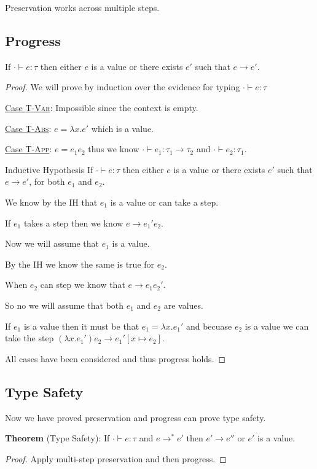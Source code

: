 \documentclass{lecturenotes}
\newenvironment{theorem}[2][Theorem]{\begin{trivlist}
\item[\hskip \labelsep {\bfseries #1}\hskip \labelsep {\bfseries #2.}]}{\end{trivlist}}
\newenvironment{corollary}[2][Corollary]{\begin{trivlist}
\item[\hskip \labelsep {\bfseries #1}\hskip \labelsep {\bfseries #2.}]}{\end{trivlist}}
\begin{document}
\begin{corollary}{Multi-step Preservation}
  Preservation works across multiple steps. 
\end{corollary}

\subsection{Progress}

\begin{theorem}{Progress}
  If $\cdot \vdash e : \tau$ then either $e$ is a value or there exists $e'$ such that $e \rightarrow e'$. 
\end{theorem}

\begin{proof}
  We will prove by induction over the evidence for typing $\cdot \vdash e : \tau$

  \underline{Case \textsc{T-Var}}: Impossible since the context is empty.

  \underline{Case \textsc{T-Abs}}: $e = \lambda x.e'$ which is a value. 

  \underline{Case \textsc{T-App}}: $e = e_1e_2$ thus we know $\cdot \vdash e_1 : \tau_1 \rightarrow \tau_2$ and $\cdot \vdash e_2 : \tau_1$.

    Inductive Hypothesis If $\cdot \vdash e : \tau$ then either $e$ is a value or there exists $e'$ such that $e \rightarrow e'$, for both $e_1$ and $e_2$. 

    We know by the IH that $e_1$ is a value or can take a step. 
  
    If $e_1$ takes a step then we know $e \rightarrow e_1'e_2$. 

    Now we will assume that $e_1$ is a value. 

    By the IH we know the same is true for $e_2$. 

    When $e_2$ can step we know that $e \rightarrow e_1e_2'$.

    So no we will assume that both $e_1$ and $e_2$ are values. 

    If $e_1$ is a value then it must be that $e_1 = \lambda x. e_1'$ and becuase $e_2$ is a value we can take the step  $(\lambda x. e_1')e_2 \rightarrow e_1' [x \mapsto e_2]$. 

    All cases have been considered and thus progress holds.
\end{proof}

\subsection{Type Safety}

Now we have proved preservation and progress can prove type safety. 


\begin{theorem}{Type System}
  \textbf{Theorem} (Type Safety): If $\cdot \vdash e : \tau $ and $e \rightarrow^* e'$ then $e' \rightarrow e''$ or $e'$ is a value.
\end{theorem} 

\begin{proof}
  Apply multi-step preservation and then progress.   
\end{proof}
\end{document}
